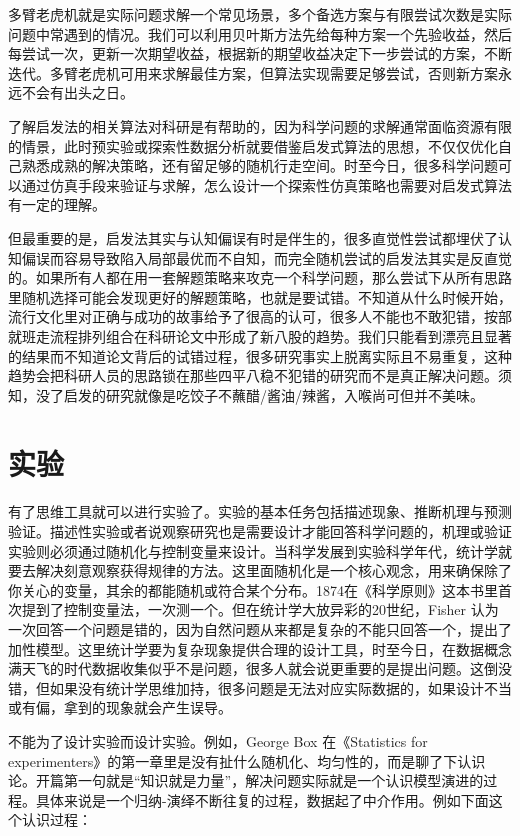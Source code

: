 \documentclass[]{tufte-book}
\begin{document}
多臂老虎机就是实际问题求解一个常见场景，多个备选方案与有限尝试次数是实际问题中常遇到的情况。我们可以利用贝叶斯方法先给每种方案一个先验收益，然后每尝试一次，更新一次期望收益，根据新的期望收益决定下一步尝试的方案，不断迭代。多臂老虎机可用来求解最佳方案，但算法实现需要足够尝试，否则新方案永远不会有出头之日。

了解启发法的相关算法对科研是有帮助的，因为科学问题的求解通常面临资源有限的情景，此时预实验或探索性数据分析就要借鉴启发式算法的思想，不仅仅优化自己熟悉成熟的解决策略，还有留足够的随机行走空间。时至今日，很多科学问题可以通过仿真手段来验证与求解，怎么设计一个探索性仿真策略也需要对启发式算法有一定的理解。

但最重要的是，启发法其实与认知偏误有时是伴生的，很多直觉性尝试都埋伏了认知偏误而容易导致陷入局部最优而不自知，而完全随机尝试的启发法其实是反直觉的。如果所有人都在用一套解题策略来攻克一个科学问题，那么尝试下从所有思路里随机选择可能会发现更好的解题策略，也就是要试错。不知道从什么时候开始，流行文化里对正确与成功的故事给予了很高的认可，很多人不能也不敢犯错，按部就班走流程排列组合在科研论文中形成了新八股的趋势。我们只能看到漂亮且显著的结果而不知道论文背后的试错过程，很多研究事实上脱离实际且不易重复，这种趋势会把科研人员的思路锁在那些四平八稳不犯错的研究而不是真正解决问题。须知，没了启发的研究就像是吃饺子不蘸醋/酱油/辣酱，入喉尚可但并不美味。

\hypertarget{exp}{%
\chapter{实验}\label{exp}}

有了思维工具就可以进行实验了。实验的基本任务包括描述现象、推断机理与预测验证。描述性实验或者说观察研究也是需要设计才能回答科学问题的，机理或验证实验则必须通过随机化与控制变量来设计。当科学发展到实验科学年代，统计学就要去解决刻意观察获得规律的方法。这里面随机化是一个核心观念，用来确保除了你关心的变量，其余的都能随机或符合某个分布。1874在《科学原则》这本书里首次提到了控制变量法，一次测一个。但在统计学大放异彩的20世纪，Fisher 认为一次回答一个问题是错的，因为自然问题从来都是复杂的不能只回答一个，提出了加性模型。这里统计学要为复杂现象提供合理的设计工具，时至今日，在数据概念满天飞的时代数据收集似乎不是问题，很多人就会说更重要的是提出问题。这倒没错，但如果没有统计学思维加持，很多问题是无法对应实际数据的，如果设计不当或有偏，拿到的现象就会产生误导。

不能为了设计实验而设计实验。例如，George Box 在《Statistics for experimenters》的第一章里是没有扯什么随机化、均匀性的，而是聊了下认识论。开篇第一句就是``知识就是力量''，解决问题实际就是一个认识模型演进的过程。具体来说是一个归纳-演绎不断往复的过程，数据起了中介作用。例如下面这个认识过程：
\end{document}
